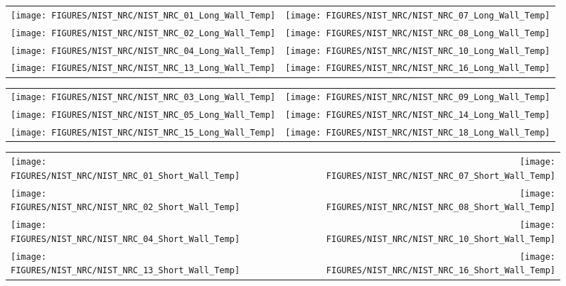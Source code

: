 \newpage


\begin{figure}[p]
\begin{tabular*}{\textwidth}{l@{\extracolsep{\fill}}r}
\texttt{[image: FIGURES/NIST\_NRC/NIST\_NRC\_01\_Long\_Wall\_Temp]} &
\texttt{[image: FIGURES/NIST\_NRC/NIST\_NRC\_07\_Long\_Wall\_Temp]} \\
\texttt{[image: FIGURES/NIST\_NRC/NIST\_NRC\_02\_Long\_Wall\_Temp]} &
\texttt{[image: FIGURES/NIST\_NRC/NIST\_NRC\_08\_Long\_Wall\_Temp]} \\
\texttt{[image: FIGURES/NIST\_NRC/NIST\_NRC\_04\_Long\_Wall\_Temp]} &
\texttt{[image: FIGURES/NIST\_NRC/NIST\_NRC\_10\_Long\_Wall\_Temp]} \\
\texttt{[image: FIGURES/NIST\_NRC/NIST\_NRC\_13\_Long\_Wall\_Temp]} &
\texttt{[image: FIGURES/NIST\_NRC/NIST\_NRC\_16\_Long\_Wall\_Temp]}
\end{tabular*}
\label{NIST_NRC_Long_Wall_Temp_Closed}
\end{figure}

\begin{figure}[p]
\begin{tabular*}{\textwidth}{l@{\extracolsep{\fill}}r}
\texttt{[image: FIGURES/NIST\_NRC/NIST\_NRC\_03\_Long\_Wall\_Temp]} &
\texttt{[image: FIGURES/NIST\_NRC/NIST\_NRC\_09\_Long\_Wall\_Temp]} \\
\texttt{[image: FIGURES/NIST\_NRC/NIST\_NRC\_05\_Long\_Wall\_Temp]} &
\texttt{[image: FIGURES/NIST\_NRC/NIST\_NRC\_14\_Long\_Wall\_Temp]} \\
\texttt{[image: FIGURES/NIST\_NRC/NIST\_NRC\_15\_Long\_Wall\_Temp]} &
\texttt{[image: FIGURES/NIST\_NRC/NIST\_NRC\_18\_Long\_Wall\_Temp]}
\end{tabular*}
\label{NIST_NRC_Long_Wall_Temp_Open}
\end{figure}

\begin{figure}[p]
\begin{tabular*}{\textwidth}{l@{\extracolsep{\fill}}r}
\texttt{[image: FIGURES/NIST\_NRC/NIST\_NRC\_01\_Short\_Wall\_Temp]} &
\texttt{[image: FIGURES/NIST\_NRC/NIST\_NRC\_07\_Short\_Wall\_Temp]} \\
\texttt{[image: FIGURES/NIST\_NRC/NIST\_NRC\_02\_Short\_Wall\_Temp]} &
\texttt{[image: FIGURES/NIST\_NRC/NIST\_NRC\_08\_Short\_Wall\_Temp]} \\
\texttt{[image: FIGURES/NIST\_NRC/NIST\_NRC\_04\_Short\_Wall\_Temp]} &
\texttt{[image: FIGURES/NIST\_NRC/NIST\_NRC\_10\_Short\_Wall\_Temp]} \\
\texttt{[image: FIGURES/NIST\_NRC/NIST\_NRC\_13\_Short\_Wall\_Temp]} &
\texttt{[image: FIGURES/NIST\_NRC/NIST\_NRC\_16\_Short\_Wall\_Temp]}
\end{tabular*}
\label{NIST_NRC_Short_Wall_Temp_Closed}
\end{figure}

